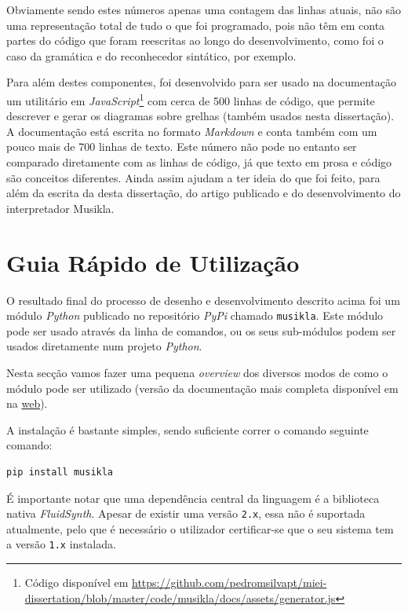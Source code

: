 Obviamente sendo estes números apenas uma contagem das linhas atuais, não são uma representação total de tudo o que foi programado, pois não têm em conta partes do código que foram  reescritas ao longo do desenvolvimento, como foi o caso da gramática e do reconhecedor sintático, por exemplo.

Para além destes componentes, foi desenvolvido para ser usado na documentação um utilitário em \textit{JavaScript}\footnote{Código disponível em \url{https://github.com/pedromsilvapt/miei-dissertation/blob/master/code/musikla/docs/assets/generator.js}} com cerca de 500 linhas de código, que permite descrever e gerar os diagramas sobre grelhas (também usados nesta dissertação). A documentação está escrita no formato \textit{Markdown} e conta também com um pouco mais de 700 linhas de texto. Este número não pode no entanto ser comparado diretamente com as linhas de código, já que texto em prosa e código são conceitos diferentes. Ainda assim ajudam a ter ideia do que foi feito, para além da escrita da desta dissertação, do artigo publicado e do desenvolvimento do interpretador Musikla.

\chapter{Guia Rápido de Utilização}
O resultado final do processo de desenho e desenvolvimento descrito acima foi um módulo \textit{Python} publicado no repositório \textit{PyPi} chamado \texttt{musikla}. Este módulo pode ser usado através da linha de comandos, ou os seus sub-módulos podem ser usados diretamente num projeto \textit{Python}.

Nesta secção vamos fazer uma pequena \textit{overview} dos diversos modos de como o módulo pode ser utilizado (versão da documentação mais completa disponível em na \href{https://pedromsilvapt.github.io/miei-dissertation/}{web}).

A instalação é bastante simples, sendo suficiente correr o comando seguinte comando:

\begin{lstlisting}[caption={Processo de instalação do \textit{package} musikla},label={lst:install-musikla},language=Bash]
pip install musikla
\end{lstlisting}

É importante notar que uma dependência central da linguagem é a biblioteca nativa \textit{FluidSynth}. Apesar de existir uma versão \texttt{2.x}, essa não é suportada atualmente, pelo que é necessário o utilizador certificar-se que o seu sistema tem a versão \texttt{1.x} instalada.

